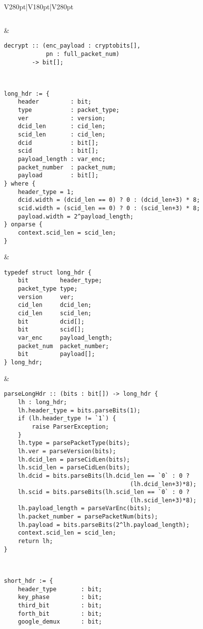 \documentclass[10pt,a4paper,landscape]{article}
\begin{document}
\begin{longtable}{V{280pt}|V{180pt}|V{280pt}}
\begin{Verbatim}[fontsize=\small]
		\end{Verbatim}
		 &
		\begin{Verbatim}[fontsize=\small]
decrypt :: (enc_payload : cryptobits[],
            pn : full_packet_num) 
        -> bit[];
		\end{Verbatim}
	\\ \hline
		\begin{Verbatim}[fontsize=\small]
long_hdr := {
    header         : bit;
    type           : packet_type;
    ver            : version;
    dcid_len       : cid_len;
    scid_len       : cid_len;
    dcid           : bit[];
    scid           : bit[];
    payload_length : var_enc;
    packet_number  : packet_num;
    payload        : bit[];
} where {
    header_type = 1;
    dcid.width = (dcid_len == 0) ? 0 : (dcid_len+3) * 8;
    scid.width = (scid_len == 0) ? 0 : (scid_len+3) * 8;
    payload.width = 2^payload_length;
} onparse {
    context.scid_len = scid_len;
}
		\end{Verbatim}
		& 
		\begin{Verbatim}[fontsize=\small]
typedef struct long_hdr {
    bit         header_type;
    packet_type type;
    version     ver;
    cid_len     dcid_len;
    cid_len     scid_len;
    bit         dcid[];
    bit         scid[];
    var_enc     payload_length;
    packet_num  packet_number;
    bit         payload[];
} long_hdr;
		\end{Verbatim}
		 &
		\begin{Verbatim}[fontsize=\small]
parseLongHdr :: (bits : bit[]) -> long_hdr {
    lh : long_hdr;
    lh.header_type = bits.parseBits(1);
    if (lh.header_type != `1`) {
        raise ParserException;
    }
    lh.type = parsePacketType(bits);
    lh.ver = parseVersion(bits);
    lh.dcid_len = parseCidLen(bits);
    lh.scid_len = parseCidLen(bits);
    lh.dcid = bits.parseBits(lh.dcid_len == `0` : 0 ?
                                    (lh.dcid_len+3)*8);
    lh.scid = bits.parseBits(lh.scid_len == `0` : 0 ?
                                    (lh.scid_len+3)*8);
    lh.payload_length = parseVarEnc(bits);
    lh.packet_number = parsePacketNum(bits);
    lh.payload = bits.parseBits(2^lh.payload_length);
    context.scid_len = scid_len;
    return lh;
}
		\end{Verbatim}
	\\ \hline
		\begin{Verbatim}[fontsize=\small]
short_hdr := {
    header_type       : bit;
    key_phase         : bit;
    third_bit         : bit;
    forth_bit         : bit;
    google_demux      : bit;

\end{Verbatim}
\end{longtable}
\end{document}
